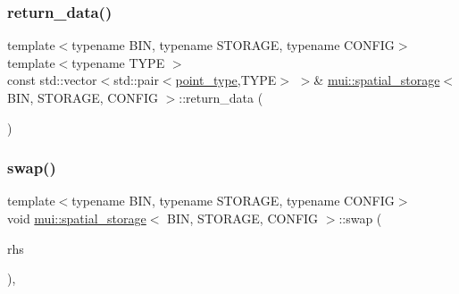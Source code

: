 \mbox{\label{classmui_1_1spatial__storage_af19e719b90b4b4e70177ab4c371879a4}} 
\subsubsection{\texorpdfstring{return\+\_\+data()}{return\_data()}}
{\footnotesize\ttfamily template$<$typename B\+IN, typename S\+T\+O\+R\+A\+GE, typename C\+O\+N\+F\+IG$>$ \\
template$<$typename T\+Y\+PE $>$ \\
const std\+::vector$<$std\+::pair$<$\hyperlink{classmui_1_1spatial__storage_a29c9b70a3becee947f2ffa55264d8fde}{point\+\_\+type},T\+Y\+PE$>$ $>$\& \hyperlink{classmui_1_1spatial__storage}{mui\+::spatial\+\_\+storage}$<$ B\+IN, S\+T\+O\+R\+A\+GE, C\+O\+N\+F\+IG $>$\+::return\+\_\+data (\begin{DoxyParamCaption}{ }\end{DoxyParamCaption})\hspace{0.3cm}{\ttfamily [inline]}}

\mbox{\label{classmui_1_1spatial__storage_a81252131a0ac8535291fd644b0a5af54}} 
\subsubsection{\texorpdfstring{swap()}{swap()}}
{\footnotesize\ttfamily template$<$typename B\+IN, typename S\+T\+O\+R\+A\+GE, typename C\+O\+N\+F\+IG$>$ \\
void \hyperlink{classmui_1_1spatial__storage}{mui\+::spatial\+\_\+storage}$<$ B\+IN, S\+T\+O\+R\+A\+GE, C\+O\+N\+F\+IG $>$\+::swap (\begin{DoxyParamCaption}\item[{\hyperlink{classmui_1_1spatial__storage}{spatial\+\_\+storage}$<$ B\+IN, S\+T\+O\+R\+A\+GE, C\+O\+N\+F\+IG $>$ \&}]{rhs }\end{DoxyParamCaption})\hspace{0.3cm}{\ttfamily [inline]}, {\ttfamily [noexcept]}}



